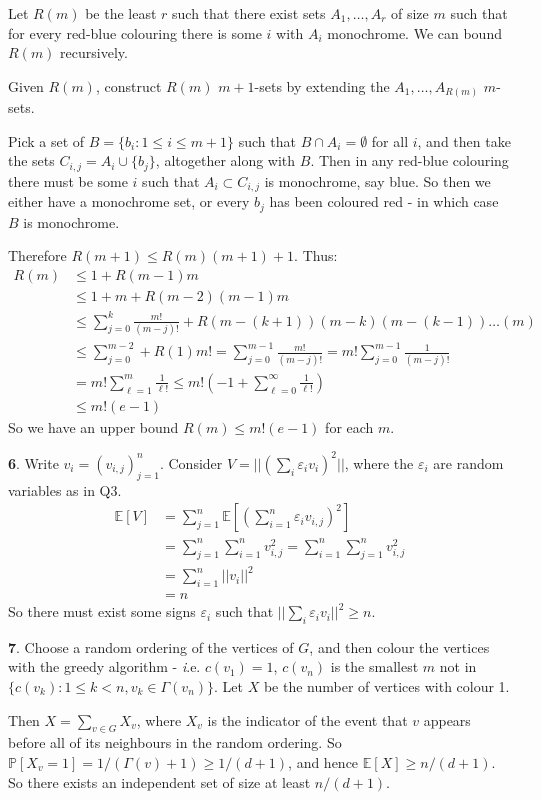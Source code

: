 \documentclass[]{article}
\theoremstyle{custhm}
\theoremstyle{cusdef}
\theoremstyle{custhm}
\theoremstyle{custhm}
\theoremstyle{custhm}
\theoremstyle{custhm}
\theoremstyle{cusdef}
\theoremstyle{remark}
\newcommand{\eps}{\varepsilon}
\newcommand{\E}{\mathbb{E}}
\renewcommand{\P}{\mathbb{P}}
\renewcommand{\it}[1]{\textit{#1}}
\begin{document}
Let $R(m)$ be the least $r$ such that there exist sets $A_1,\dots,A_r$ of size $m$ such that for every red-blue colouring there is some $i$ with $A_i$ monochrome. We can bound $R(m)$ recursively.

Given $R(m)$, construct $R(m)$ $m+1$-sets by extending the $A_1,\dots,A_{R(m)}$ $m$-sets.

Pick a set of $B = \{b_i:1\le i\le m+1\}$ such that $B\cap A_i = \emptyset$ for all $i$, and then take the sets $C_{i,j} = A_i\cup\{b_j\}$, altogether along with $B$. Then in any red-blue colouring there must be some $i$ such that $A_i\subset C_{i,j}$ is monochrome, say blue. So then we either have a monochrome set, or every $b_j$ has been coloured red - in which case $B$ is monochrome.

Therefore $R(m+1)\le R(m)(m+1)+1$. Thus:
\begin{align*}
R(m) &\le 1 + R(m-1)m\\
&\le 1 + m + R(m-2)(m-1)m\\
&\le \sum_{j=0}^{k}\frac{m!}{(m-j)!}+R(m-(k+1))(m-k)(m-(k-1))\dots(m)\\
&\le \sum_{j=0}^{m-2} + R(1)m!= \sum_{j=0}^{m-1}\frac{m!}{(m-j)!} =m!\sum_{j = 0}^{m-1}\frac{1}{(m-j)!}\\
&=m!\sum_{\ell = 1}^{m}\frac{1}{\ell!} \le m!(-1 + \sum_{\ell = 0}^{\infty}\frac{1}{\ell!})\\
&\le m!(e-1)
\end{align*}
So we have an upper bound $R(m)\le m!(e-1)$ for each $m$.

\textbf{6}. Write $v_i = (v_{i,j})_{j=1}^n$. Consider $V = ||\left(\sum_i \eps_i v_i\right)^2||$, where the $\eps_i$ are random variables as in Q3.
\begin{align*}
\E[V] &= \sum_{j=1}^{n}\E\left[\left(\sum_{i=1}^{n}\eps_i v_{i,j}\right)^2\right]\\
&= \sum_{j=1}^{n}\sum_{i=1}^{n}v_{i,j}^2 = \sum_{i=1}^{n}\sum_{j=1}^{n}v_{i,j}^2\\
&=\sum_{i=1}^{n}||v_i||^2\\
&=n
\end{align*}
So there must exist some signs $\eps_i$ such that $||\sum_i\eps_i v_i||^2 \ge n$.

\textbf{7}. Choose a random ordering of the vertices of $G$, and then colour the vertices with the greedy algorithm - {\it i.e.} $c(v_1) = 1$, $c(v_n)$ is the smallest $m$ not in $\{c(v_k):1\le k<n, v_k\in \Gamma(v_n)\}$. Let $X$ be the number of vertices with colour 1.

Then $X = \sum_{v\in G}X_v$, where $X_v$ is the indicator of the event that $v$ appears before all of its neighbours in the random ordering. So $\P[X_v = 1] = 1/(\Gamma(v)+1) \ge 1/(d+1)$, and hence $\E[X] \ge n/(d+1)$. So there exists an independent set of size at least $n/(d+1)$.
\end{document}

